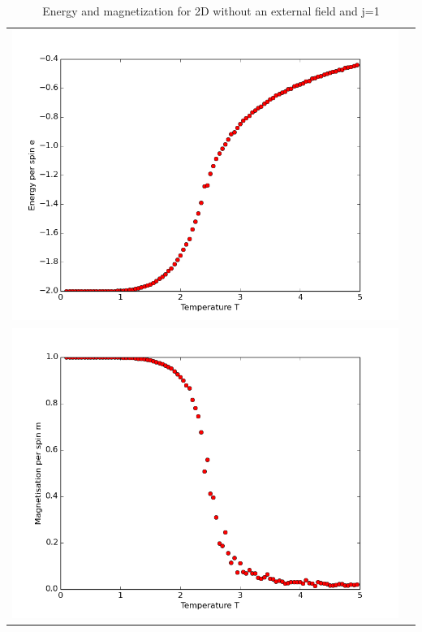 \documentclass[12pt,a4paper,titlepage]{article}
\begin{document}
\begin{table}
\centering
\begin{tabular}{cc}
\includegraphics[width=13cm]{Plots/E_Mean_2}\\
\includegraphics[width=13cm]{Plots/Mag_Mean_2} \\
\end{tabular} 
\caption{Energy and magnetization for 2D without an external field and j=1}
\end{table}
\end{document}
